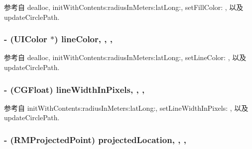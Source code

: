 参考自 dealloc, init\-With\-Contents\-:radius\-In\-Meters\-:lat\-Long\-:, set\-Fill\-Color\-: , 以及 update\-Circle\-Path.

\hypertarget{interface_r_m_circle_a4d11b58b738e2bf11a6041d2388f63eb}{
\subsubsection[{line\-Color}]{\setlength{\rightskip}{0pt plus 5cm}-\/ (U\-I\-Color $\ast$) line\-Color\hspace{0.3cm}{\ttfamily [read]}, {\ttfamily [write]}, {\ttfamily [nonatomic]}, {\ttfamily [retain]}}}\label{interface_r_m_circle_a4d11b58b738e2bf11a6041d2388f63eb}


参考自 dealloc, init\-With\-Contents\-:radius\-In\-Meters\-:lat\-Long\-:, set\-Line\-Color\-: , 以及 update\-Circle\-Path.

\hypertarget{interface_r_m_circle_a3772331ca60c8812a35183c856983a17}{
\subsubsection[{line\-Width\-In\-Pixels}]{\setlength{\rightskip}{0pt plus 5cm}-\/ (C\-G\-Float) line\-Width\-In\-Pixels\hspace{0.3cm}{\ttfamily [read]}, {\ttfamily [write]}, {\ttfamily [nonatomic]}, {\ttfamily [assign]}}}\label{interface_r_m_circle_a3772331ca60c8812a35183c856983a17}


参考自 init\-With\-Contents\-:radius\-In\-Meters\-:lat\-Long\-:, set\-Line\-Width\-In\-Pixels\-: , 以及 update\-Circle\-Path.

\hypertarget{interface_r_m_circle_a676b4e82ff075de3e4468a12f506006f}{
\subsubsection[{projected\-Location}]{\setlength{\rightskip}{0pt plus 5cm}-\/ ({\bf R\-M\-Projected\-Point}) projected\-Location\hspace{0.3cm}{\ttfamily [read]}, {\ttfamily [write]}, {\ttfamily [nonatomic]}, {\ttfamily [assign]}}}\label{interface_r_m_circle_a676b4e82ff075de3e4468a12f506006f}


